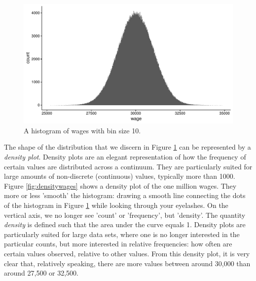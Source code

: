 \documentclass[]{book}\usepackage[]{graphicx}\usepackage[]{color}
\makeatletter
\def\maxwidth{ %
  \ifdim\Gin@nat@width>\linewidth
    \linewidth
  \else
    \Gin@nat@width
  \fi
}
\newenvironment{knitrout}{}{} %
\makeatother
\begin{document}
\begin{knitrout}
\color{fgcolor}\begin{figure}

{\centering \includegraphics[width=\maxwidth]{figure/histbin2-1} 

}

\caption[A histogram of wages with bin size 10]{A histogram of wages with bin size 10.}\label{fig:histbin2}
\end{figure}


\end{knitrout}

The shape of the distribution that we discern in Figure \ref{fig:histbin2} can be represented by a \textit{density plot}. Density plots are an elegant representation of how the frequency of certain values are distributed across a continuum. They are particularly suited for large amounts of non-discrete (continuous) values, typically more than 1000. Figure \ref{fig:densitywages} shows a density plot of the one million wages. They more or less 'smooth' the histogram: drawing a smooth line connecting the dots of the histogram in Figure \ref{fig:histbin2} while looking through your eyelashes. On the vertical axis, we no longer see 'count' or 'frequency', but 'density'. The quantity \textit{density} is defined such that the area under the curve equals 1. Density plots are particularly suited for large data sets, where one is no longer interested in the particular counts, but  more interested in relative frequencies: how often are certain values observed, relative to other values. From this density plot, it is very clear that, relatively speaking, there are more values between around 30,000 than around 27,500 or 32,500.
\end{document}
